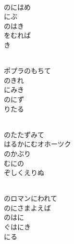 \documentclass[10pt,b5j]{tarticle} %
\begin{document}
\vspace{1.5em} %
\newcommand{\linespace}{0.5em} %
\newcommand{\blocksize}{0.5\hsize} %
\newcommand{\itemmargin}{6em} %
\begin{enumerate} %
    \setlength{\itemindent}{\itemmargin} %
    \begin{minipage}[c]{\blocksize}
    
        \vspace{\linespace}
        \item~\\
        のにはめ\\
        にぶ\\
        のはき\\
        をむれば\\
        き
        
        \vspace{\linespace}
        \item~\\
        ポプラのもちて\\
        のきれ\\
        にみき\\
        のにず\\
        りたる
        
        \vspace{\linespace}
        \item~\\
        のたたずみて\\
        はるかにむオホーツク\\
        のかぶり\\
        むにの\\
        ぞしくえりぬ
        
        \vspace{\linespace}
        \item~\\
        のロマンにわれて\\
        のにさまよえば\\
        のはに\\
        ぐはにき\\
        にる
        

\end{minipage}
\end{enumerate}
\end{document}
